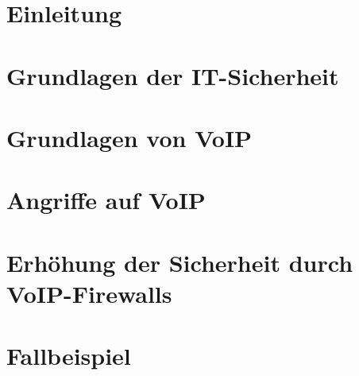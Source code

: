 \documentclass [a4paper,11pt,oneside,german,webreferences,todo]{INSOthesis}
\begin{document}
\maketitle


%

\chapter{Einleitung}
\label{ch:ch1}


\chapter{Grundlagen der IT-Sicherheit}
\label{ch:ch2}


\chapter{Grundlagen von VoIP}
\label{ch:ch3}


\chapter{Angriffe auf VoIP}
\label{ch:ch4}


\chapter{Erhöhung der Sicherheit durch VoIP-Firewalls}
\label{ch:ch5}


\chapter{Fallbeispiel}
\label{ch:ch6}

\end{document}
